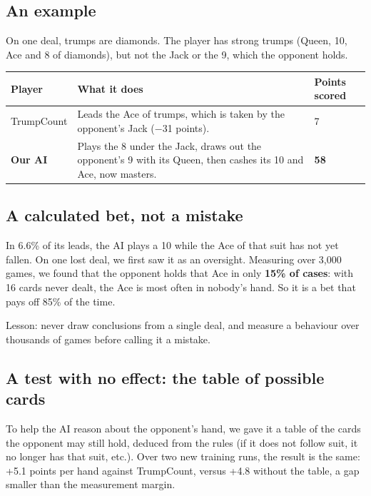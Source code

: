\subsection*{An example}

On one deal, trumps are diamonds. The player has strong trumps (Queen, 10, Ace and 8 of diamonds), but not the Jack or the 9, which the opponent holds.

\begin{table}[htbp]\centering\small\begin{tabularx}{\linewidth}{lXl}\toprule

Player & What it does & Points scored \\\midrule

TrumpCount & Leads the Ace of trumps, which is taken by the opponent's Jack (−31 points). & 7 \\

\textbf{Our AI} & Plays the 8 under the Jack, draws out the opponent's 9 with its Queen, then cashes its 10 and Ace, now masters. & \textbf{58} \\

\bottomrule\end{tabularx}\end{table}

\subsection*{A calculated bet, not a mistake}

In 6.6\% of its leads, the AI plays a 10 while the Ace of that suit has not yet fallen. On one lost deal, we first saw it as an oversight. Measuring over 3,000 games, we found that the opponent holds that Ace in only \textbf{15\% of cases}: with 16 cards never dealt, the Ace is most often in nobody's hand. So it is a bet that pays off 85\% of the time.

Lesson: never draw conclusions from a single deal, and measure a behaviour over thousands of games before calling it a mistake.

\subsection*{A test with no effect: the table of possible cards}

To help the AI reason about the opponent's hand, we gave it a table of the cards the opponent may still hold, deduced from the rules (if it does not follow suit, it no longer has that suit, etc.). Over two new training runs, the result is the same: +5.1 points per hand against TrumpCount, versus +4.8 without the table, a gap smaller than the measurement margin.


